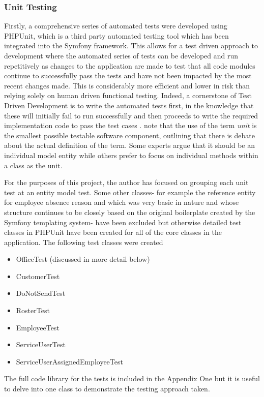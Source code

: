 \documentclass[a4paper,Times New Roman 11pt]{article}
\begin{document}
\subsubsection {Unit Testing}

Firstly, a comprehensive series of automated tests were developed using PHPUnit, which is a third party automated testing tool which has been integrated into the Symfony framework. This allows for a test driven approach to development where the automated series of tests can be developed and run repetitively as changes to the application are made to test that all code modules continue to successfully pass the tests and have not been impacted by the most recent changes made. This is considerably more efficient and lower in risk than relying solely on human driven functional testing. Indeed, a cornerstone of Test Driven Development is to write the automated tests first, in the knowledge that these will initially fail to run successfully and then proceeds to write the required implementation code to pass the test cases \parencite{maxwilliams}.
\parencite{janzen} note that the use of the term \textit{unit} is the smallest possible testable software component, outlining that there is debate about the actual definition of the term. Some experts argue that it should be an individual model entity while others prefer to focus on individual methods within a class as the unit. 

For the purposes of this project, the author has focused on grouping each unit test at an entity model test. Some other classes- for example the reference entity for employee absence reason and which was very basic in nature and whose structure continues to be closely based on the original boilerplate created by the Symfony templating system- have been excluded but otherwise detailed test classes in PHPUnit have been created for all of the core classes in the application. 
The following test classes were created
\begin{itemize}
\item OfficeTest (discussed in more detail below)
\item CustomerTest
\item DoNotSendTest
\item RosterTest
\item EmployeeTest
\item ServiceUserTest
\item ServiceUserAssignedEmployeeTest
\end{itemize}
The full code library for the tests is included in the Appendix One but it is useful to delve into one class to demonstrate the testing approach taken.
\end{document}
